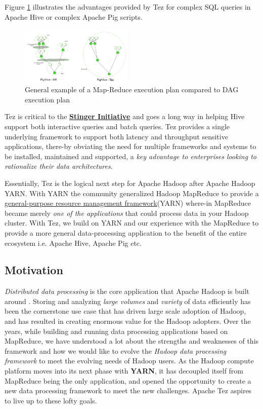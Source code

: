 \documentclass[twocolumn]{article}
\begin{document}
Figure \ref{fig02} illustrates the advantages provided by Tez for complex
SQL queries in Apache Hive or complex Apache Pig scripts.

\begin{figure}[htb]
        \centering
        \includegraphics[width=0.48\textwidth]{pighivetez.png}
        \caption{General example of a Map-Reduce execution plan compared to DAG execution plan}
        \label{fig02}
\end{figure}

Tez is critical to the
\href{http://hortonworks.com/blog/100x-faster-hive}{\textbf{Stinger
Initiative}} and goes a long way in helping Hive support both
interactive queries and batch queries. Tez provides a single underlying
framework to support both latency and throughput sensitive applications,
there-by obviating the need for multiple frameworks and systems to be
installed, maintained and supported, a \emph{key advantage to
enterprises looking to rationalize their data architectures}.

Essentially, Tez is the logical next step for Apache Hadoop after Apache
Hadoop YARN. With YARN the community generalized Hadoop MapReduce to
provide a
\href{http://hortonworks.com/blog/introducing-apache-hadoop-yarn/}{general-purpose
resource management framework}(YARN) where-in MapReduce became merely
\emph{one of the applications} that could process data in your Hadoop
cluster. With Tez, we build on YARN and our experience with the
MapReduce to provide a more general data-processing application to the
benefit of the entire ecosystem i.e. Apache Hive, Apache Pig etc.

\subsection{Motivation}

\emph{Distributed data processing} is the core application that Apache
Hadoop is built around \cite{FOWLER:2013}.  Storing and analyzing \emph{large volumes} and
\emph{variety} of data efficiently has been the cornerstone use case
that has driven large scale adoption of Hadoop, and has resulted in
creating enormous value for the Hadoop adopters. Over the years, while
building and running data processing applications based on MapReduce, we
have understood a lot about the strengths and weaknesses of this
framework and how we would like to evolve the \emph{Hadoop data
processing framework} to meet the evolving needs of Hadoop users. As the
Hadoop compute platform moves into its next phase with \textbf{YARN}, it
has decoupled itself from MapReduce being the only application, and
opened the opportunity to create a new data processing framework to meet
the new challenges. Apache Tez aspires to live up to these lofty goals.
\end{document}
